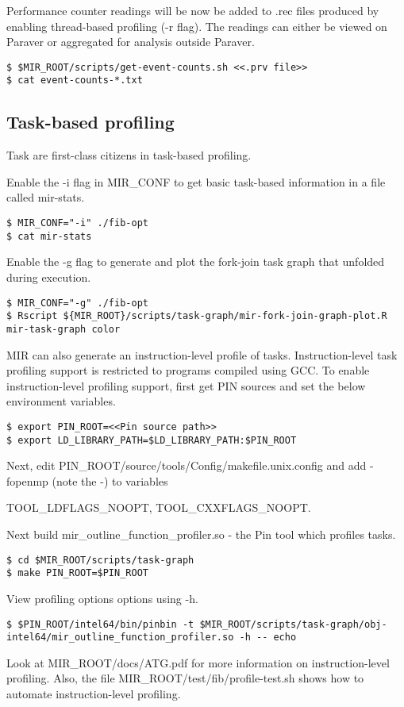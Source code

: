 \documentclass[11pt,a4paper,notitlepage]{article}
\begin{document}
Performance counter readings will be now be added to .rec files produced by enabling thread-based profiling (-r flag). 
The readings can either be viewed on Paraver or aggregated for analysis outside Paraver. 

\begin{lstlisting}[style=BashInputStyle]
$ $MIR_ROOT/scripts/get-event-counts.sh <<.prv file>>
$ cat event-counts-*.txt
\end{lstlisting}

\subsection{Task-based profiling}
Task are first-class citizens in task-based profiling.

Enable the -i flag in MIR\_CONF to get basic task-based information in a file called mir-stats.

\begin{lstlisting}[style=BashInputStyle]
$ MIR_CONF="-i" ./fib-opt
$ cat mir-stats
\end{lstlisting}

Enable the -g flag to generate and plot the fork-join task graph that unfolded during execution.

\begin{lstlisting}[style=BashInputStyle]
$ MIR_CONF="-g" ./fib-opt
$ Rscript ${MIR_ROOT}/scripts/task-graph/mir-fork-join-graph-plot.R mir-task-graph color
\end{lstlisting}

MIR can also generate an instruction-level profile of tasks.
Instruction-level task profiling support is restricted to programs compiled using GCC.
To enable instruction-level profiling support, first get PIN sources and set the below environment variables.

\begin{lstlisting}[style=BashInputStyle]
$ export PIN_ROOT=<<Pin source path>>
$ export LD_LIBRARY_PATH=$LD_LIBRARY_PATH:$PIN_ROOT
\end{lstlisting}

Next, edit PIN\_ROOT/source/tools/Config/makefile.unix.config and add -fopenmp (note the -) to variables 
\begin{tiny}{TOOL\_LDFLAGS\_NOOPT, TOOL\_CXXFLAGS\_NOOPT}.\end{tiny}

Next build mir\_outline\_function\_profiler.so - the Pin tool which profiles tasks.
\begin{lstlisting}[style=BashInputStyle]
$ cd $MIR_ROOT/scripts/task-graph
$ make PIN_ROOT=$PIN_ROOT
\end{lstlisting}

View profiling options options using -h.
\begin{lstlisting}[style=BashInputStyle]
$ $PIN_ROOT/intel64/bin/pinbin -t $MIR_ROOT/scripts/task-graph/obj-intel64/mir_outline_function_profiler.so -h -- echo
\end{lstlisting}

Look at MIR\_ROOT/docs/ATG.pdf for more information on instruction-level profiling.
Also, the file MIR\_ROOT/test/fib/profile-test.sh shows how to automate instruction-level profiling.
\end{document}
